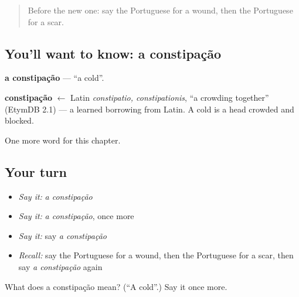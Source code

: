 \begin{quote}
Before the new one: say the Portuguese for a wound, then the Portuguese for a scar.
\end{quote}

\subsection*{You'll want to know: a constipação}
\textbf{a constipação} — \textquotedblleft{}a cold\textquotedblright{}.

\begin{cousinweb}
\textbf{constipação} $\leftarrow$ Latin \emph{constipatio, constipationis}, \textquotedblleft{}a crowding together\textquotedblright{} (EtymDB 2.1) — a learned borrowing from Latin. A cold is a head crowded and blocked.
\end{cousinweb}

\begin{grammarlens}[title={What you've built}]
One more word for this chapter.
\end{grammarlens}

\subsection*{Your turn}
\begin{itemize}
\raggedright
  \item \emph{Say it:} \emph{a constipação}
  \item \emph{Say it:} \emph{a constipação}, once more
  \item \emph{Say it:} say \emph{a constipação}
  \item \emph{Recall:} say the Portuguese for a wound, then the Portuguese for a scar, then say \emph{a constipação} again
\end{itemize}

\begin{tcolorbox}[breakable,colback=teal!4,colframe=teal!35!black,title={Before you move on}]
What does a constipação mean? (\textquotedblleft{}A cold\textquotedblright{}.) Say it once more.
\end{tcolorbox}
